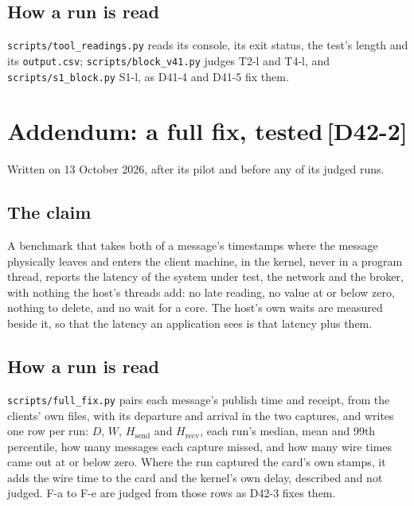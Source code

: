 \documentclass[11pt]{article}
\newcommand{\chg}[1]{\,{\color{chgcol}\bfseries\footnotesize[#1]}}
\begin{document}
\subsection*{How a run is read}
\texttt{scripts/tool\_readings.py} reads its console, its exit status, the test's length and its
\texttt{output.csv}; \texttt{scripts/block\_v41.py} judges T2-l and T4-l, and
\texttt{scripts/s1\_block.py} S1-l, as D41-4 and D41-5 fix them.

\section[Addendum: a full fix, tested]{Addendum: a full fix, tested\protect\chg{D42-2}}\label{sec:addendum-v42}
Written on 13 October 2026, after its pilot and before any of its judged runs.

\subsection*{The claim}
A benchmark that takes both of a message's timestamps where the message physically leaves and
enters the client machine, in the kernel, never in a program thread, reports the latency of the
system under test, the network and the broker, with nothing the host's threads add: no late
reading, no value at or below zero, nothing to delete, and no wait for a core. The host's own waits
are measured beside it, so that the latency an application sees is that latency plus them.

\subsection*{How a run is read}
\texttt{scripts/full\_fix.py} pairs each message's publish time and receipt, from the clients' own
files, with its departure and arrival in the two captures, and writes one row per run: $D$, $W$,
$H_{\mathrm{send}}$ and $H_{\mathrm{recv}}$, each run's median, mean and 99th percentile, how many
messages each capture missed, and how many wire times came out at or below zero. Where the run
captured the card's own stamps, it adds the wire time to the card and the kernel's own delay,
described and not judged. F-a to F-e are judged from those rows as D42-3 fixes them.
\end{document}
